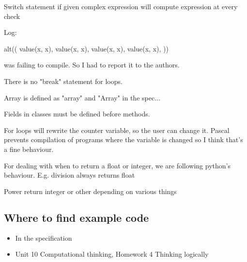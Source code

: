 \documentclass{article}
\begin{document}
Switch statement if given complex expression will compute expression at every
check

Log:


alt((
	value(x, x),
	value(x, x),
	value(x, x),
	value(x, x),
))

was failing to compile. So I had to report it to the authors.

There is no "break" statement for loops.

Array is defined as "array" and "Array" in the spec...

Fields in classes must be defined before methods.

For loops will rewrite the counter variable, so the user can change it.
Pascal prevents compilation of programs where the variable is changed so I
think that's a fine behaviour.

For dealing with when to return a float or integer, we are following python's
behaviour. E.g. division always returns float

Power return integer or other depending on various things

\subsection{Where to find example code}

\begin{itemize}
	\item In the specification
	\item Unit 10 Computational thinking, Homework 4 Thinking logically
\end{itemize}

\printbibliography[heading=bibintoc]
\end{document}
